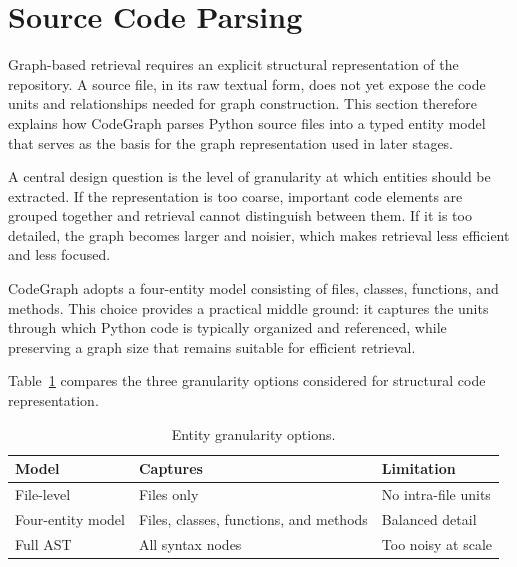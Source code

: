 \section{Source Code Parsing}
\label{sec:parsing}

Graph-based retrieval requires an explicit structural representation of the repository. A source file, in its raw textual form, does not yet expose the code units and relationships needed for graph construction. This section therefore explains how CodeGraph parses Python source files into a typed entity model that serves as the basis for the graph representation used in later stages.

A central design question is the level of granularity at which entities should be extracted. If the representation is too coarse, important code elements are grouped together and retrieval cannot distinguish between them. If it is too detailed, the graph becomes larger and noisier, which makes retrieval less efficient and less focused.

CodeGraph adopts a four-entity model consisting of files, classes, functions, and methods. This choice provides a practical middle ground: it captures the units through which Python code is typically organized and referenced, while preserving a graph size that remains suitable for efficient retrieval.

Table~\ref{tab:entity-granularity} compares the three granularity options considered for structural code representation.

\begin{table}[H]
    \centering
    \caption{Entity granularity options.}
    \label{tab:entity-granularity}
    \cgtablerows
    \small
    \begin{tabularx}{\textwidth}{@{} >{\RaggedRight\arraybackslash}p{3.1cm}
        >{\RaggedRight\arraybackslash}X
        >{\RaggedRight\arraybackslash}p{4.5cm} @{}}
        \toprule
        \textbf{Model} & \textbf{Captures} & \textbf{Limitation} \\
        \midrule
        File-level & Files only & No intra-file units \\
        Four-entity model &
        Files, classes, functions, and methods &
        Balanced detail \\
        Full AST & All syntax nodes & Too noisy at scale \\
        \bottomrule
    \end{tabularx}
\end{table}

